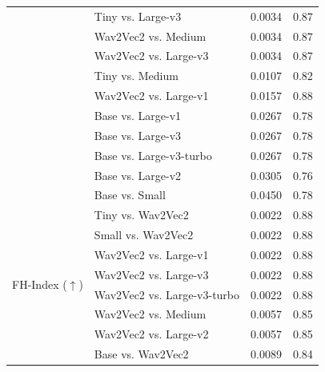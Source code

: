 \begin{table}[!t]
\begin{minipage}[t]{0.49\textwidth}
\begin{tabular}{@{}l l c c@{}}
 & Tiny vs. Large-v3 & 0.0034 & 0.87 \\
 & Wav2Vec2 vs. Medium & 0.0034 & 0.87 \\
 & Wav2Vec2 vs. Large-v3 & 0.0034 & 0.87 \\
 & Tiny vs. Medium & 0.0107 & 0.82 \\
 & Wav2Vec2 vs. Large-v1 & 0.0157 & 0.88 \\
 & Base vs. Large-v1 & 0.0267 & 0.78 \\
 & Base vs. Large-v3 & 0.0267 & 0.78 \\
 & Base vs. Large-v3-turbo & 0.0267 & 0.78 \\
 & Base vs. Large-v2 & 0.0305 & 0.76 \\
 & Base vs. Small & 0.0450 & 0.78 \\
\midrule
\multirow{8}{*}{FH-Index ($\uparrow$)}
 & Tiny vs. Wav2Vec2 & 0.0022 & 0.88 \\
 & Small vs. Wav2Vec2 & 0.0022 & 0.88 \\
 & Wav2Vec2 vs. Large-v1 & 0.0022 & 0.88 \\
 & Wav2Vec2 vs. Large-v3 & 0.0022 & 0.88 \\
 & Wav2Vec2 vs. Large-v3-turbo & 0.0022 & 0.88 \\
 & Wav2Vec2 vs. Medium & 0.0057 & 0.85 \\
 & Wav2Vec2 vs. Large-v2 & 0.0057 & 0.85 \\
 & Base vs. Wav2Vec2 & 0.0089 & 0.84 \\
\bottomrule
\end{tabular}
\end{minipage}
\end{table}
